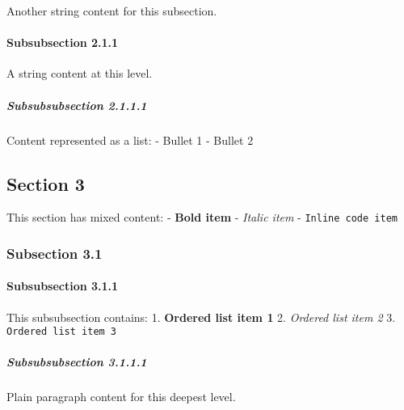Another string content for this subsection.

\hypertarget{subsubsection-2.1.1}{%
\paragraph{Subsubsection 2.1.1}\label{subsubsection-2.1.1}}

A string content at this level.

\hypertarget{subsubsubsection-2.1.1.1}{%
\subparagraph{Subsubsubsection 2.1.1.1}\label{subsubsubsection-2.1.1.1}}

Content represented as a list: - Bullet 1 - Bullet 2

\hypertarget{section-3}{%
\subsection{Section 3}\label{section-3}}

This section has mixed content: - \textbf{Bold item} - \emph{Italic
item} - \texttt{Inline\ code\ item}

\hypertarget{subsection-3.1}{%
\subsubsection{Subsection 3.1}\label{subsection-3.1}}

\hypertarget{subsubsection-3.1.1}{%
\paragraph{Subsubsection 3.1.1}\label{subsubsection-3.1.1}}

This subsubsection contains: 1. \textbf{Ordered list item 1} 2.
\emph{Ordered list item 2} 3. \texttt{Ordered\ list\ item\ 3}

\hypertarget{subsubsubsection-3.1.1.1}{%
\subparagraph{Subsubsubsection 3.1.1.1}\label{subsubsubsection-3.1.1.1}}

Plain paragraph content for this deepest level.
